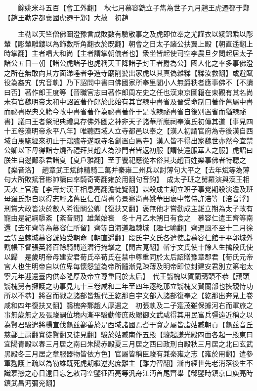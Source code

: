 　　餘姚米斗五百【會工外翻】　秋七月慕容皝立子雋為世子九月趙王虎遷都于鄴【趙王勒定都襄國虎遷于鄴】大赦　初趙

　　主勒以天竺僧佛圖澄豫言成敗數有驗敬事之及虎即位奉之尤謹衣以綾錦乘以彫輦【彫輦雕鏤以為飾數所角翻衣於既翻】朝會之日太子諸公扶翼上殿【朝直遥翻上時掌翻】主者唱大和尚【主者謂掌朝儀者也】衆坐皆起使司空李農旦夕問起居太子諸公五日一朝【諸公虎諸子也虎稱天王降諸子封王者爵為公】國人化之率多事佛澄之所在無敢向其方面涕唾者争造寺廟削髪出家虎以其真偽雜糅【糅汝救翻】或避賦役為姦宄【宄音軌】乃下詔問中書曰佛國家所奉里閭小人無爵秩者應事佛不【不讀曰否】著作郎王度等【晉職官志曰著作郎周左史之任也漢東京圖籍在東觀有其名尚未有官魏明帝太和中詔置著作郎於此始有其官隸中書省及晉受命制曰著作舊屬中書而祕書既典文籍今改中書省著作為祕書著作于是改隸祕書省自後别置省而猶隸祕書】議曰王者祭祀典禮具存佛外國之神非天子諸華所應祠奉漢氏初傳其道【事見四十五卷漢明帝永平八年】唯聽西域人立寺都邑以奉之【漢人初謂官府為寺後漢自西域白馬駞經來初止于鴻臚寺遂取寺名創置白馬寺】漢人皆不得出家魏世亦然今宜禁公卿以下毋得詣寺燒香禮拜其趙人為沙門者皆返初服【謂使還服華人之服】虎詔曰朕生自邊鄙忝君諸夏【夏戶雅翻】至于饗祀應從本俗其夷趙百姓樂事佛者特聽之【樂音洛】　趙章武王斌帥精騎二萬并秦雍二州兵以討薄句大平之【去年斌等為薄句大所敗斌音彬帥讀曰率騎奇寄翻雍於用翻句音鉤】　成太子班之舅羅演與漢王相天水上官澹【李壽封漢王相息亮翻澹徒覽翻】謀殺成主期立班子事覺期殺演澹及班母羅氏期自以得志輕諸舊臣信任尚書令景騫尚書姚華田褒中常侍許涪等【涪音浮】刑賞大政皆决於數人希復關公卿【復扶又翻】褒無他才嘗勸成主雄立期為太子故有寵由是紀綱隳紊【紊音問】雄業始衰　冬十月乙未朔日有食之　慕容仁遣王齊等南還【去年齊等為慕容仁所留】齊等自海道趣棘城【趣七喻翻】齊遇風不至十二月徐孟等至棘城慕容皝始受朝命【朝直遥翻】段氏宇文氏各遣使詣慕容仁館于平郭城外皝帳下督張英將百餘騎閒道潜行掩擊之【閒古莧翻】斬宇文氏使十餘人生擒段氏使以歸　是歲明帝母建安君荀氏卒荀氏在禁中尊重同於太后詔贈豫章郡君【荀氏元帝宮人也生明帝自以位卑每懷怨望為帝所譴漸見疎薄及明帝即位封建安君別立第宅太寧元年迎還臺内供奉隆厚及帝立尊重同於太后】　代王翳槐以賀蘭藹頭不恭【藹頭翳槐舅有擁護之功事見九十三卷咸和二年至四年逐紇那立翳槐又賀蘭部也挾親恃功所以不恭】將召而戮之諸部皆叛代王紇那自宇文部入諸部復奉之【紇那出奔見上卷咸和四年復扶又翻】翳槐奔鄴趙人厚遇之　初張軌及二子寔茂雖保據河右而軍旅之事無歲無之及張駿嗣位境内漸平駿勤修庶政總御文武咸得其用民富兵彊遠近稱之以為賢君駿遣將楊宣伐龜兹鄯善於是西域諸國焉耆于窴之屬皆詣姑臧朝貢【龜兹音丘慈鄯上扇翻窴徒賢翻又徒見翻】駿於姑臧南作五殿【駿起謙光殿四面各起一殿東曰宜陽青殿以春三月居之南曰朱陽赤殿夏三月居之西曰政刑白殿秋三月居之北曰玄武黑殿冬三月居之章服器物皆依方色】官屬皆稱臣駿有兼秦雍之志【雍於用翻】遣參軍麴護上疏以為勒雄既死虎期繼逆兆庶離主【離力智翻】漸冉經世先老消落後生不識慕戀之心日遠日忘乞敕司空鑒征西亮等汎舟江沔首尾齊舉【郗鑒時鎮京口庾亮時鎮武昌沔彌兖翻】

